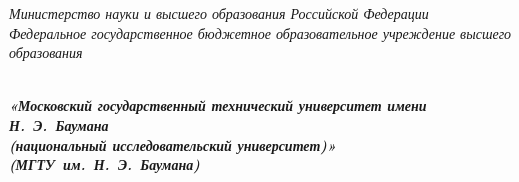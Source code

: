 
\begin{titlepage}
\thispagestyle{empty}

{\large
\begin{center}
	\textsl{Министерство науки и высшего образования Российской Федерации \\ Федеральное государственное бюджетное образовательное учреждение высшего образования}
	\vspace{2em}
\end{center}
}
{
\begin{minipage}[t]{0.13\textwidth}
	\centering{}
	\end{minipage}\hfill
\begin{minipage}[t]{0.65\textwidth}
	\begin{center}
		\large  \textsl{\textbf {\\ «Московский государственный технический университет имени Н.~Э.~Баумана \\ (национальный исследовательский университет)» \\ (МГТУ~им.~Н.~Э.~Баумана)}}
	\end{center}
\end{minipage}
}


\end{titlepage}

